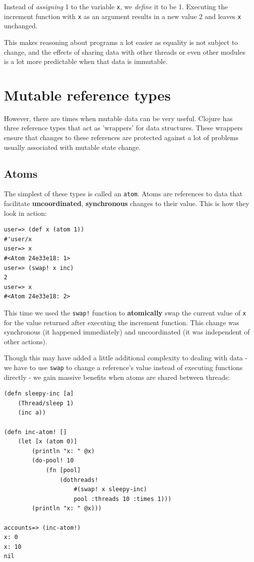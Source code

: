 \documentclass[a4paper,12pt]{kth-mag}
\begin{document}
Instead of \textit{assigning} 1 to the variable \texttt{x}, we \textit{define} it to be 1. Executing the increment function with \texttt{x} as an argument results in a new value 2 and leaves \texttt{x} unchanged.

This makes reasoning about programs a lot easier as equality is not subject to change, and the effects of sharing data with other threads or even other modules is a lot more predictable when that data is immutable.

\section{Mutable reference types}

However, there are times when mutable data can be very useful. Clojure has three reference types that act as 'wrappers' for data structures. These wrappers ensure that changes to these references are protected against a lot of problems usually associated with mutable state change.

\subsection{Atoms}

The simplest of these types is called an \texttt{atom}. Atoms are references to data that facilitate \textbf{uncoordinated}, \textbf{synchronous} changes to their value. This is how they look in action:

\begin{listing}[H]
	\begin{verbatim}
user=> (def x (atom 1))
#'user/x
user=> x
#<Atom 24e33e18: 1>
user=> (swap! x inc)
2
user=> x
#<Atom 24e33e18: 2>
	\end{verbatim}
\end{listing}

This time we used the \texttt{swap!} function to \textbf{atomically} swap the current value of \texttt{x} for the value returned after executing the increment function. This change was synchronous (it happened immediately) and uncoordinated (it was independent of other actions).

Though this may have added a little additional complexity to dealing with data - we have to use \texttt{swap} to change a reference's value instead of executing functions directly - we gain massive benefits when atoms are shared between threads:

\begin{listing}[H]
	\begin{verbatim}
(defn sleepy-inc [a]
    (Thread/sleep 1)
    (inc a))

(defn inc-atom! []
    (let [x (atom 0)]
        (println "x: " @x)
        (do-pool! 10
            (fn [pool]
                (dothreads! 
                    #(swap! x sleepy-inc) 
                    pool :threads 10 :times 1)))
        (println "x: " @x)))
        
accounts=> (inc-atom!)
x: 0
x: 10
nil
	\end{verbatim}
\end{listing}
\end{document}
